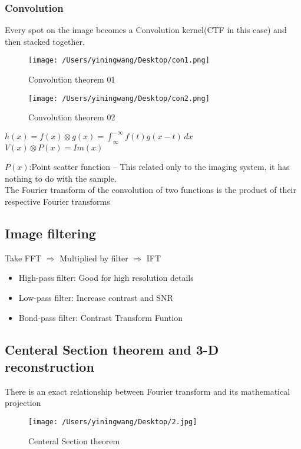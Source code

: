 \documentclass{article}
\begin{document}
    \subsubsection{Convolution}
    Every spot on the image becomes a Convolution kernel(CTF in this case) and then stacked together.
    \begin{figure}[h]
        \centering
        \texttt{[image: /Users/yiningwang/Desktop/con1.png]} 
        \caption{\small Convolution theorem 01}
    \end{figure}
    \begin{figure}[ht]
        \centering
        \texttt{[image: /Users/yiningwang/Desktop/con2.png]} 
        \caption{\small Convolution theorem 02}
    \end{figure}
    \begin{center}
        \begin{framed}
            $h(x) = f(x) \otimes   g(x) = \int_{\infty}^{-\infty} f(t)g(x - t) \,dx $ \\ 
            $V(x) \otimes P(x) = Im(x)$
        \end{framed}
    \end{center}
    $P(x)$:Point scatter function -- This related only to the imaging system, it has nothing to do with the sample.\\
    The Fourier transform of the convolution of two 
    functions is the product of their respective Fourier transforms
    \subsection{Image filtering}
    Take FFT $\Longrightarrow$ Multiplied by filter $\Longrightarrow$ IFT
    \begin{itemize}
        \item High-pass filter: Good for high resolution details
        \item Low-pass filter: Increase contrast and SNR
        \item Bond-pass filter: Contrast Transform Funtion 
    \end{itemize}
    \subsection{Centeral Section theorem and 3-D reconstruction}
    There is an exact relationship between Fourier transform and its mathematical projection\\
    \begin{figure}[h]
        \centering
        \texttt{[image: /Users/yiningwang/Desktop/2.jpg]} 
        \caption{\small Centeral Section theorem}
    \end{figure}
\end{document}
